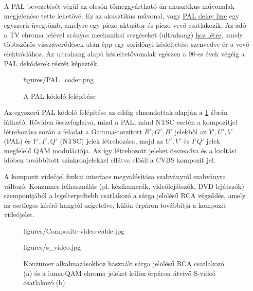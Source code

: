 A PAL bevezetését végül az olcsón tömeggyártható ún akusztikus művonalak megjelenése tette lehetővé.
Ez az akusztikus művonal, vagy \href{https://www.google.com/search?q=PAL+delay+line&client=firefox-b-d&sxsrf=ALeKk03EUTzVwc7dkYJFnEK-nlEI_p3hng:1586379019108&source=lnms&tbm=isch&sa=X&ved=2ahUKEwi90Kav2tnoAhXJ-ioKHWz6AJcQ_AUoAXoECA0QAw&biw=1407&bih=675}{PAL delay line} egy egyszerű üvegtömb, amelyre egy piezo aktuátor és piezo vevő csatlakozik.
Az adó a TV chroma jelével arányos mechanikai rezgéseket (ultrahang) \href{https://www.youtube.com/watch?v=-qerYLM-eEg}{hoz létre}, amely többszörös visszaverődések után épp egy soridőnyi késleltetést szenvedve ér a vevő elektródához.
Az ultrahang alapú késleltetővonalak egészen a 90-es évek végéig a PAL dekóderek részét képezték.


\begin{figure}[]
	\centering
	\begin{overpic}[width = 0.82\columnwidth ]{figures/PAL_coder.png}
	\end{overpic} \hfill
	\caption{A PAL kódoló felépítése}
	\label{Fig:PAL_coder}
\end{figure}
Az egyszerű PAL kódoló felépítése az eddig elmondottak alapján a \ref{Fig:PAL_coder} ábrán látható.
Röviden összefoglalva, mind a PAL, mind NTSC esetén a kompozitjel létrehozása során a feladat a Gamma-torzított $R',G',B'$ jelekből az $Y',U',V$ (PAL) és $Y',I',Q'$ (NTSC) jelek létrehozása, majd az $U',V'$ és $I'Q'$ jelek megfelelő QAM modulációja. 
Az így létrehozott jeleket összeadva és a kioltási időben továbbított szinkronjelekkel ellátva előáll a CVBS kompozit jel.

\vspace{3mm}
A kompozit videójel fizikai interface megvalósítása szabványról szabványra változó.
Konzumer felhasználás (pl. kézikamerák, videólejátszók, DVD lejátszók) szempontjából a legelterjedtebb csatlakozó a sárga jelölésű RCA végződés, amely az esetleges kísérő hangtól szigetelve, külön érpáron továbbítja a kompozit videójelet.
\begin{figure}[]
	\centering
	\begin{minipage}[c]{0.6\textwidth}
	\begin{overpic}[width = 0.45\columnwidth ]{figures/Composite-video-cable.jpg}
	\end{overpic} 
		\begin{overpic}[width = 0.45\columnwidth ]{figures/s_video.jpg}
	\end{overpic} \end{minipage}\hfill
	\begin{minipage}[c]{0.4\textwidth}
	\caption{Konzumer alkalmazásokhoz használt sárga jelölésű RCA csatlakozó (a) és a luma-QAM chroma jeleket külön érpáron átvivő S-videó csatlakozó (b)}
	\label{Fig:composite_video}  \end{minipage}
\end{figure}

